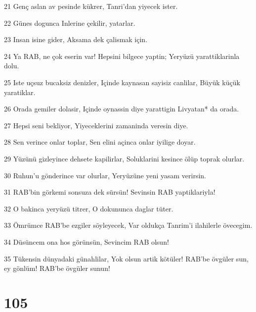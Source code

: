 \par 21 Genç aslan av pesinde kükrer, Tanri'dan yiyecek ister.
\par 22 Günes dogunca Inlerine çekilir, yatarlar.
\par 23 Insan isine gider, Aksama dek çalismak için.
\par 24 Ya RAB, ne çok eserin var! Hepsini bilgece yaptin; Yeryüzü yarattiklarinla dolu.
\par 25 Iste uçsuz bucaksiz denizler, Içinde kaynasan sayisiz canlilar, Büyük küçük yaratiklar.
\par 26 Orada gemiler dolasir, Içinde oynassin diye yarattigin Livyatan* da orada.
\par 27 Hepsi seni bekliyor, Yiyeceklerini zamaninda veresin diye.
\par 28 Sen verince onlar toplar, Sen elini açinca onlar iyilige doyar.
\par 29 Yüzünü gizleyince dehsete kapilirlar, Soluklarini kesince ölüp toprak olurlar.
\par 30 Ruhun'u gönderince var olurlar, Yeryüzüne yeni yasam verirsin.
\par 31 RAB'bin görkemi sonsuza dek sürsün! Sevinsin RAB yaptiklariyla!
\par 32 O bakinca yeryüzü titrer, O dokununca daglar tüter.
\par 33 Ömrümce RAB'be ezgiler söyleyecek, Var oldukça Tanrim'i ilahilerle övecegim.
\par 34 Düsüncem ona hos görünsün, Sevincim RAB olsun!
\par 35 Tükensin dünyadaki günahlilar, Yok olsun artik kötüler! RAB'be övgüler sun, ey gönlüm! RAB'be övgüler sunun!

\chapter{105}

